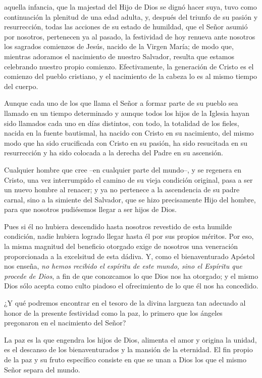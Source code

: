 \begin{body}
	 aquella infancia, que la majestad del Hijo de Dios se dignó hacer suya, tuvo como continuación la plenitud de una edad adulta, y, después del triunfo de su pasión y resurrección, todas las acciones de su estado de humildad, que el Señor asumió por nosotros, pertenecen ya al pasado, la festividad de hoy renueva ante nosotros los sagrados comienzos de Jesús, nacido de la Virgen María; de modo que, mientras adoramos el nacimiento de nuestro Salvador, resulta que estamos celebrando nuestro propio comienzo. Efectivamente, la generación de Cristo es el comienzo del pueblo cristiano, y el nacimiento de la cabeza lo es al mismo tiempo del cuerpo.
	
	Aunque cada uno de los que llama el Señor a formar parte de su pueblo sea llamado en un tiempo determinado y aunque todos los hijos de la Iglesia hayan sido llamados cada uno en días distintos, con todo, la totalidad de los fieles, nacida en la fuente bautismal, ha nacido con Cristo en su nacimiento, del mismo modo que ha sido crucificada con Cristo en su pasión, ha sido resucitada en su resurrección y ha sido colocada a la derecha del Padre en su ascensión.
	
	Cualquier hombre que cree --en cualquier parte del mundo--, y se regenera en Cristo, una vez interrumpido el camino de su vieja condición original, pasa a ser un nuevo hombre al renacer; y ya no pertenece a la ascendencia de su padre carnal, sino a la simiente del Salvador, que se hizo precisamente Hijo del hombre, para que nosotros pudiésemos llegar a ser hijos de Dios.
	
	Pues si él no hubiera descendido hasta nosotros revestido de esta humilde condición, nadie hubiera logrado llegar hasta él por sus propios méritos. Por eso, la misma magnitud del beneficio otorgado exige de nosotros una veneración proporcionada a la excelsitud de esta dádiva. Y, como el bienaventurado Apóstol nos enseña, \emph{no hemos recibido el espíritu de este mundo, sino el Espíritu que procede de Dios}, a fin de que conozcamos lo que Dios nos ha otorgado; y el mismo Dios sólo acepta como culto piadoso el ofrecimiento de lo que él nos ha concedido.
	
	¿Y qué podremos encontrar en el tesoro de la divina largueza tan adecuado al honor de la presente festividad como la paz, lo primero que los ángeles pregonaron en el nacimiento del Señor?
	
	La paz es la que engendra los hijos de Dios, alimenta el amor y origina la unidad, es el descanso de los bienaventurados y la mansión de la eternidad. El fin propio de la paz y su fruto específico consiste en que se unan a Dios los que el mismo Señor separa del mundo.
	

\end{body}
